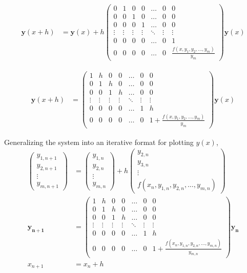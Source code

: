 \documentclass{beamer}
\providecommand{\brak}[1]{\ensuremath{\left(#1\right)}}
\theoremstyle{remark}
\newcommand{\myvec}[1]{\ensuremath{\begin{pmatrix}#1\end{pmatrix}}}
\let\vec\mathbf
\numberwithin{equation}{section}
\begin{document}
\begin{frame}
\begin{align}
    \vec{y}\brak{x+h} &= \vec{y}\brak{x} + h\myvec{0 & 1 & 0 & 0 & \dots & 0 & 0\\ 0 & 0 & 1 & 0 & \dots & 0 & 0\\0 & 0 & 0 & 1 & \dots & 0 & 0\\\vdots & \vdots & \vdots & \vdots& \ddots & \vdots & \vdots\\ 0 & 0 & 0 & 0 & \dots & 0 & 1\\0 & 0 & 0 & 0 & \dots & 0 &\frac{f\brak{x, y_1, y_2, \dots, y_m}}{y_m}}\vec{y}\brak{x}
\end{align}
\end{frame}

\begin{frame}
\begin{align}
    \vec{y}\brak{x+h} &= \myvec{1 & h & 0 & 0 & \dots & 0 & 0\\ 0 & 1 & h & 0 & \dots & 0 & 0\\0 & 0 & 1 & h & \dots & 0 & 0\\\vdots & \vdots & \vdots & \vdots& \ddots & \vdots & \vdots\\ 0 & 0 & 0 & 0 & \dots & 1 & h\\0 & 0 & 0 & 0 & \dots & 0 & 1+\frac{f\brak{x, y_1, y_2, \dots, y_m}}{y_m}}\vec{y}\brak{x}
\end{align}
\end{frame}

\begin{frame}
Generalizing the system into an iterative format for plotting $y\brak{x}$,
\begin{align}
    \myvec{y_{1, n + 1}\\y_{2, n + 1}\\\vdots\\y_{m, n + 1}} &= \myvec{y_{1, n}\\y_{2, n}\\\vdots\\y_{m, n}} + h\myvec{y_{2, n}\\y_{3, n}\\\vdots\\f\brak{x_n, y_{1, n}, y_{2, n}, \dots, y_{m, n}}}\\
    \vec{y_{n + 1}} &= \myvec{1 & h & 0 & 0 & \dots & 0 & 0\\ 0 & 1 & h & 0 & \dots & 0 & 0\\0 & 0 & 1 & h & \dots & 0 & 0\\\vdots & \vdots & \vdots & \vdots& \ddots & \vdots & \vdots\\ 0 & 0 & 0 & 0 & \dots & 1 & h\\0 & 0 & 0 & 0 & \dots & 0 & 1+\frac{f\brak{x_n, y_{1, n}, y_{2, n}, \dots, y_{m, n}}}{y_{m, n}}}\vec{y_n}\\
    x_{n + 1} &= x_{n} + h
\end{align}
\end{frame}
\end{document}
